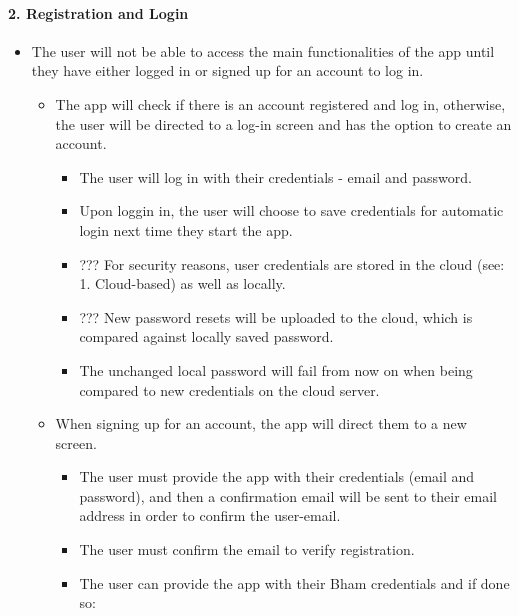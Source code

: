 \documentclass[a4paper,11pt]{article} %
\begin{document}
\hypertarget{registration-and-login}{%
\paragraph{2. Registration and Login}\label{registration-and-login}}

\begin{itemize}
 
\item
  The user will not be able to access the main functionalities of the
  app until they have either logged in or signed up for an account to
  log in.

  \begin{itemize}
   
  \item
    The app will check if there is an account registered and log in,
    otherwise, the user will be directed to a log-in screen and has the
    option to create an account.

    \begin{itemize}
     
    \item
      The user will log in with their credentials - email and password.
    \item
      Upon loggin in, the user will choose to save credentials for
      automatic login next time they start the app.
    \item
      ??? For security reasons, user credentials are stored in the cloud
      (see: 1. Cloud-based) as well as locally.
    \item
      ??? New password resets will be uploaded to the cloud, which is
      compared against locally saved password.
    \item
      The unchanged local password will fail from now on when being
      compared to new credentials on the cloud server.
    \end{itemize}
  \item
    When signing up for an account, the app will direct them to a new
    screen.

    \begin{itemize}
     
    \item
      The user must provide the app with their credentials (email and
      password), and then a confirmation email will be sent to their
      email address in order to confirm the user-email.
    \item
      The user must confirm the email to verify registration.
    \item
      The user can provide the app with their Bham credentials and if
      done so:


\end{itemize}
\end{itemize}
\end{itemize}
\end{document}
